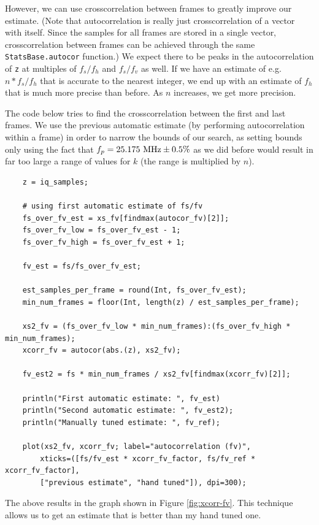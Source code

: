 \documentclass{article}
\newcommand*{\code}[1]{\texttt{#1}}
\begin{document}
However, we can use crosscorrelation between frames to greatly improve our estimate. (Note that autocorrelation is really just crosscorrelation of a vector with itself. Since the samples for all frames are stored in a single vector, crosscorrelation between frames can be achieved through the same \code{StatsBase.autocor} function.) We expect there to be peaks in the autocorrelation of \code{z} at multiples of $f_s / f_h$ and $f_s / f_v$ as well. If we have an estimate of e.g. $n * f_s / f_h$ that is accurate to the nearest integer, we end up with an estimate of $f_h$ that is much more precise than before. As $n$ increases, we get more precision.

The code below tries to find the crosscorrelation between the first and last frames. We use the previous automatic estimate (by performing autocorrelation within a frame) in order to narrow the bounds of our search, as setting bounds only using the fact that $f_p = \textnormal{25.175 MHz} \pm \textnormal{0.5\%}$ as we did before would result in far too large a range of values for $k$ (the range is multiplied by $n$).

\begin{verbatim}
    z = iq_samples;

    # using first automatic estimate of fs/fv
    fs_over_fv_est = xs_fv[findmax(autocor_fv)[2]];
    fs_over_fv_low = fs_over_fv_est - 1;
    fs_over_fv_high = fs_over_fv_est + 1;

    fv_est = fs/fs_over_fv_est;

    est_samples_per_frame = round(Int, fs_over_fv_est);
    min_num_frames = floor(Int, length(z) / est_samples_per_frame);

    xs2_fv = (fs_over_fv_low * min_num_frames):(fs_over_fv_high * min_num_frames);
    xcorr_fv = autocor(abs.(z), xs2_fv);

    fv_est2 = fs * min_num_frames / xs2_fv[findmax(xcorr_fv)[2]];

    println("First automatic estimate: ", fv_est)
    println("Second automatic estimate: ", fv_est2);
    println("Manually tuned estimate: ", fv_ref);

    plot(xs2_fv, xcorr_fv; label="autocorrelation (fv)",
        xticks=([fs/fv_est * xcorr_fv_factor, fs/fv_ref * xcorr_fv_factor],
        ["previous estimate", "hand tuned"]), dpi=300);
\end{verbatim}

The above results in the graph shown in Figure \ref{fig:xcorr-fv}. This technique allows us to get an estimate that is better than my hand tuned one.
\end{document}
